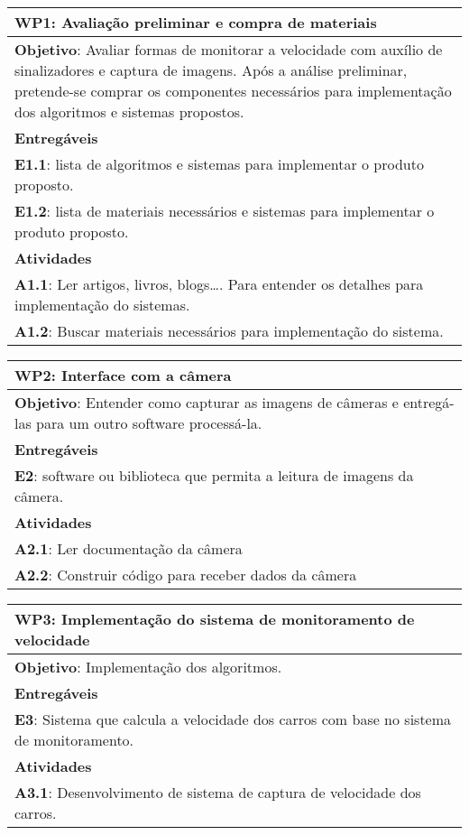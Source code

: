 \begin{longtable}{p{\textwidth}}
\toprule%
\myrowcolour%
\bfseries WP1: Avaliação preliminar e compra de materiais \\
\midrule
\textbf{Objetivo}: Avaliar formas de monitorar a velocidade com auxílio de sinalizadores e captura de imagens. Após a análise preliminar, pretende-se comprar os componentes necessários para implementação dos algoritmos e sistemas propostos.\\
\midrule
\myrowcolour%
\bfseries Entregáveis \\
\midrule
\textbf{E1.1}: lista de algoritmos e sistemas para implementar o produto proposto. \\
\textbf{E1.2}: lista de materiais necessários e sistemas para implementar o produto proposto. \\
\midrule
\myrowcolour%
\bfseries Atividades \\
\midrule
\textbf{A1.1}: Ler artigos, livros, blogs…. Para entender os detalhes para implementação do sistemas. \\
\textbf{A1.2}: Buscar materiais necessários para implementação do sistema. \\
\bottomrule
\end{longtable}

\begin{longtable}{p{\textwidth}}
\toprule%
\myrowcolour%
\bfseries WP2: Interface com a câmera \\
\midrule
\textbf{Objetivo}: Entender como capturar as imagens de câmeras e entregá-las para um outro software processá-la.\\
\midrule
\myrowcolour%
\bfseries Entregáveis \\
\midrule
\textbf{E2}: software ou biblioteca que permita a leitura de imagens da câmera. \\
\midrule
\myrowcolour%
\bfseries Atividades \\
\midrule
\textbf{A2.1}: Ler documentação da câmera\\
\textbf{A2.2}: Construir código para receber dados da câmera\\
\bottomrule
\end{longtable}

\begin{longtable}{p{\textwidth}}
\toprule%
\myrowcolour%
\bfseries WP3: Implementação do sistema de monitoramento de velocidade \\
\midrule
\textbf{Objetivo}: Implementação dos algoritmos.\\
\midrule
\myrowcolour%
\bfseries Entregáveis \\
\midrule
\textbf{E3}: Sistema que calcula a velocidade dos carros com base no sistema de monitoramento. \\
\midrule
\myrowcolour%
\bfseries Atividades \\
\midrule
\textbf{A3.1}: Desenvolvimento de sistema de captura de velocidade dos carros.\\
\bottomrule
\end{longtable}

